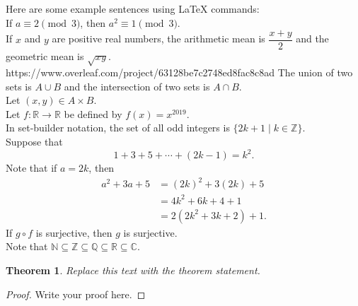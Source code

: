 \documentclass[11pt]{article}
\newtheorem*{theorem}{Theorem}
\newcommand{\NN}{\mathbb{N}}
\newcommand{\ZZ}{\mathbb{Z}}
\newcommand{\RR}{\mathbb{R}}
\newcommand{\QQ}{\mathbb{Q}}
\newcommand{\CC}{\mathbb{C}}
\begin{document}
Here are some example sentences using LaTeX commands:\\
If $a\equiv 2\pmod{3}$, then $a^2\equiv 1\pmod 3$.\\
If $x$ and $y$ are positive real numbers, the arithmetic mean is $\dfrac{x+y}{2}$ and the geometric mean is $\sqrt{xy}$.\\https://www.overleaf.com/project/63128be7c2748ed8fac8c8ad
The union of two sets is $A\cup B$ and the intersection of two sets is $A\cap B$.\\
Let $(x,y)\in A\times B$.\\
Let $f:\mathbb{R}\to\mathbb{R}$ be defined by $f(x)=x^{2019}$.\\
In set-builder notation,  the set of all odd integers is $\{2k+1\mid k\in\mathbb{Z}\}$.\\
Suppose that
\[1+3+5+\cdots+(2k-1) = k^2.\]
Note that if $a=2k$, then
\begin{align*}
    a^2+3a+5 &= (2k)^2+3(2k)+5 \\
             &= 4k^2+6k+4+1 \\
             &= 2(2k^2+3k+2)+1.
\end{align*}
If $g\circ f$ is surjective, then $g$ is surjective.\\
Note that $\NN\subseteq \ZZ\subseteq \QQ\subseteq\RR\subseteq\CC$.

\begin{theorem}
  Replace this text with the theorem statement.
\end{theorem}
\begin{proof}
  Write your proof here.
\end{proof}
\end{document}
